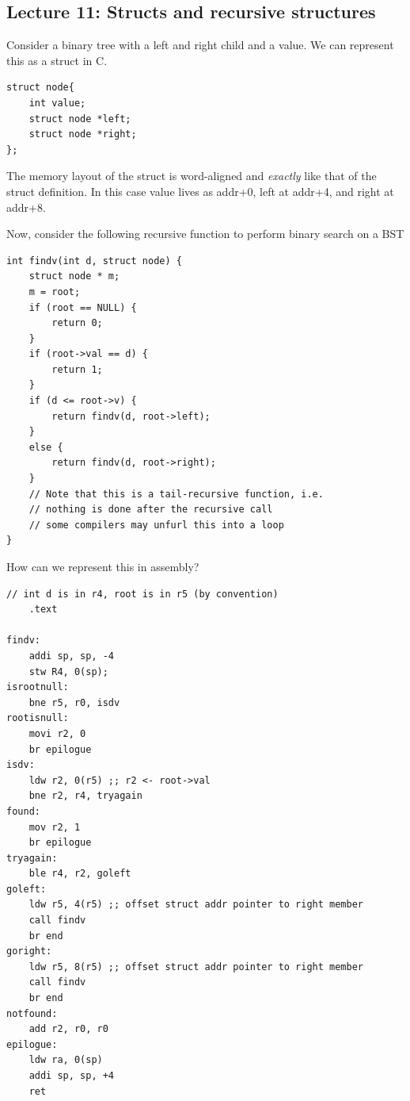 \documentclass[../notes.tex]{subfiles}
\begin{document}
\subsection{Lecture 11: Structs and recursive structures}
Consider a binary tree with a left and right child and a value. We can represent this as a struct in C.


\begin{listing}[H]
\begin{verbatim}
struct node{
	int value;
	struct node *left;
	struct node *right;
};
\end{verbatim}
\end{listing}

The memory layout of the struct is word-aligned and \textit{exactly} like that of the struct definition. In this case value lives as addr+0, left at addr+4, and right at addr+8. 




Now, consider the following recursive function to perform binary search on a BST

\begin{listing}[H]
\begin{verbatim}
int findv(int d, struct node) {
	struct node * m;
	m = root;
	if (root == NULL) {
		return 0;
	}
	if (root->val == d) {
		return 1;
	}
	if (d <= root->v) {
		return findv(d, root->left);
	}
	else {
		return findv(d, root->right);
	}
	// Note that this is a tail-recursive function, i.e. 
	// nothing is done after the recursive call
	// some compilers may unfurl this into a loop
}
\end{verbatim}
\end{listing}

How can we represent this in assembly?


\begin{listing}[H]
\begin{verbatim}
// int d is in r4, root is in r5 (by convention)
	.text

findv:
	addi sp, sp, -4
	stw R4, 0(sp);
isrootnull:
	bne r5, r0, isdv
rootisnull:
	movi r2, 0
	br epilogue
isdv:
	ldw r2, 0(r5) ;; r2 <- root->val
	bne r2, r4, tryagain
found:
	mov r2, 1
	br epilogue
tryagain:
	ble r4, r2, goleft
goleft:
	ldw r5, 4(r5) ;; offset struct addr pointer to right member
	call findv
	br end 
goright:
	ldw r5, 8(r5) ;; offset struct addr pointer to right member
	call findv
	br end
notfound:
	add r2, r0, r0
epilogue:
	ldw ra, 0(sp)
	addi sp, sp, +4
	ret
\end{verbatim}
\end{listing}
\end{document}
